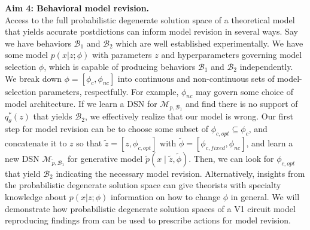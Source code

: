 \documentclass[11pt]{article}
\begin{document}
\textbf{Aim 4: Behavioral model revision.} \\
Access to the full probabilistic degenerate solution space of a theoretical model that yields accurate postdictions can inform model revision in several ways.  Say we have behaviors $\mathcal{B}_1$ and $\mathcal{B}_2$ which are well established experimentally.  We have some model $p(x | z; \phi)$ with parameters $z$ and hyperparameters governing model selection $\phi$, which is capable of producing behaviors $\mathcal{B}_1$ and $\mathcal{B}_2$ independently.  We break down $\phi = \left[\phi_c, \phi_{nc} \right]$ into continuous and non-continuous sets of model-selection parameters, respectfully.  For example, $\phi_{nc}$ may govern some choice of model architecture.  If we learn a DSN for $\mathcal{M}_{p,\mathcal{B}_1}$ and find there is no support of $q_{\theta}^*(z)$ that yields $\mathcal{B}_2$, we effectively realize that our model is wrong.  Our first step for model revision can be to choose some subset of $\phi_{c,opt} \subseteq \phi_c$, and concatenate it to $z$ so that $\tilde{z} = [z, \phi_{c,opt}]$ with $\tilde{\phi} = \left[ \phi_{c,fixed}, \phi_{nc} \right]$, and learn a new DSN $\mathcal{M}_{\tilde{p}, \mathcal{B}_1}$ for generative model $\tilde{p}(x \mid \tilde{z}, \tilde{\phi})$.  Then, we can look for $\phi_{c,opt}$ that yield $\mathcal{B}_2$ indicating the necessary model revision.  Alternatively, insights from the probabilistic degenerate solution space can give theorists with specialty knowledge about $p(x | z; \phi)$ information on how to change $\phi$ in general.  We will demonstrate how probabilistic degenerate solution spaces of a V1 circuit model reproducing findings from \cite{dipoppa2018vision} can be used to prescribe actions for model revision.



\end{document}
